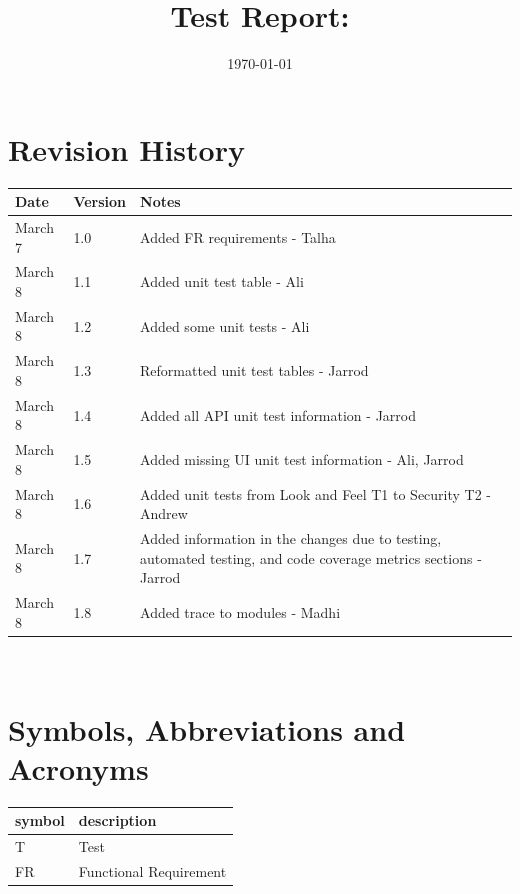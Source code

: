 \documentclass[12pt, titlepage]{article}
\begin{document}
\title{Test Report: \progname} 
\author{\authname}
\date{\today}
	
\maketitle


\section{Revision History}

\begin{tabularx}{\textwidth}{p{3cm}p{2cm}X}
\toprule {\bf Date} & {\bf Version} & {\bf Notes}\\
\midrule
March 7 & 1.0 & Added FR requirements - Talha\\
March 8 & 1.1 & Added unit test table - Ali\\
March 8 & 1.2 & Added some unit tests - Ali\\
March 8 & 1.3 & Reformatted unit test tables - Jarrod\\
March 8 & 1.4 & Added all API unit test information - Jarrod\\
March 8 & 1.5 & Added missing UI unit test information  - Ali, Jarrod\\
March 8 & 1.6 & Added unit tests from Look and Feel T1 to Security T2 - Andrew \\
March 8 & 1.7 & Added information in the changes due to testing, automated testing, and code coverage metrics sections - Jarrod\\
March 8 & 1.8 & Added trace to modules - Madhi\\
\bottomrule
\end{tabularx}

~\newpage

\section{Symbols, Abbreviations and Acronyms}

\renewcommand{\arraystretch}{1.2}
\begin{tabular}{l l} 
  \toprule		
  \textbf{symbol} & \textbf{description}\\
  \midrule 
  T & Test\\
  FR & Functional Requirement\\
  \bottomrule
\end{tabular}\\
\end{document}
